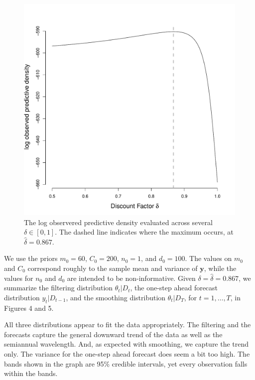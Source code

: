 \documentclass[12pt]{article}
\newcommand{\m}[1]{\mathbf{\bm{#1}}}
\begin{document}
\begin{figure}[H]
\begin{center}
\includegraphics[scale=0.34]{figs/discount.pdf}
\end{center}
\caption{The log observered predictive density evaluated across several $\delta\in[0,1]$. The dashed line indicates where the maximum occurs, at $\hat{\delta}=0.867$.}
\end{figure}

\noindent We use the priors $m_0=60$, $C_0=200$, $n_0=1$, and $d_0=100$. The values on $m_0$ and $C_0$ correspond roughly to the sample mean and variance of $\m{y}$, while the values for $n_0$ and $d_0$ are intended to be non-informative. Given $\delta=\hat{\delta}=0.867$, we summarize the filtering distribution $\theta_t|D_t$, the one-step ahead forecast distribution $y_t|D_{t-1}$, and the smoothing distribution $\theta_t|D_T$, for $t=1,\ldots,T$, in Figures 4 and 5.
\bigskip

\noindent All three distributions appear to fit the data appropriately. The filtering and the forecasts capture the general downward trend of the data as well as the semiannual wavelength. And, as expected with smoothing, we capture the trend only. The variance for the one-step ahead forecast does seem a bit too high. The bands shown in the graph are 95\% credible intervals, yet every observation falls within the bands.
\bigskip
\end{document}
